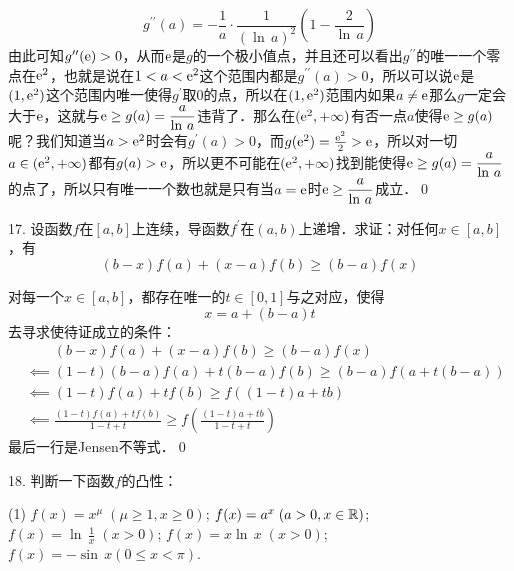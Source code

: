 \begin{equation}
    g^{\prime\prime}(a) = -\frac{1}{a} \cdot \frac{1}{\left( \ln \, a\right)^2} \left(1 - \frac{2}{\ln \, a}\right)
\end{equation}
由此可知$g^{\prime\prime}(\mathrm{e}) > 0$，从而$\mathrm{e}$是$g$的一个极小值点，并且还可以看出$g^{\prime\prime}$的唯一一个零点在$\mathrm{e}^2$，也就是说在$1 < a < \mathrm{e}^2$这个范围内都是$g^{\prime\prime}(a)> 0$，所以可以说$\mathrm{e}$是$(1,\mathrm{e}^2)$这个范围内唯一使得$g^{\prime}$取$0$的点，所以在$(1,\mathrm{e}^2)$范围内如果$a \neq \mathrm{e}$那么$g$一定会大于$\mathrm{e}$，这就与$\mathrm{e} \geq g(a) = \displaystyle\frac{a}{\ln \, a}$违背了．那么在$(\mathrm{e}^2, +\infty)$有否一点$a$使得$\mathrm{e} \geq g(a)$呢？我们知道当$a > \mathrm{e}^2$时会有$g^{\prime}(a) > 0$，而$g(\mathrm{e}^2) = \frac{\mathrm{e}^2}{2} > \mathrm{e}$，所以对一切$a \in (\mathrm{e}^2, +\infty)$都有$g(a) > \mathrm{e}$，所以更不可能在$(\mathrm{e}^2, +\infty)$找到能使得$\mathrm{e} \geq g(a) = \displaystyle\frac{a}{\ln \, a}$的点了，所以只有唯一一个数也就是只有当$a = \mathrm{e}$时$\mathrm{e} \geq \displaystyle\frac{a}{\ln \, a}$成立．\qed\bigskip

17. 设函数$f$在$[a,b]$上连续，导函数$f^\prime$在$(a,b)$上递增．求证：对任何$x \in [a,b]$，有
\begin{equation*}
    (b-x)f(a)+(x-a)f(b) \geq (b-a)f(x)
\end{equation*}

\prove 对每一个$x \in [a,b]$，都存在唯一的$t \in [0,1]$与之对应，使得
\begin{equation}
    x = a + (b-a)t
\end{equation}
去寻求使待证成立的条件：
\begin{align}
    &\mathrel{\phantom{\impliedby}} (b-x)f(a)+(x-a)f(b) \geq (b-a)f(x) \\
    &\impliedby (1-t)(b-a)f(a)+t(b-a)f(b) \geq (b-a)f(a+t(b-a)) \\
    &\impliedby (1-t)f(a) + t f(b) \geq f((1-t)a+t b) \\
    &\impliedby \frac{\left(1-t\right)f(a) + t f(b)}{1-t+t} \geq f \left(\frac{\left(1-t\right) a + t b}{1-t + t}\right)
\end{align}
最后一行是Jensen不等式．\qed\bigskip

18. 判断一下函数$f$的凸性：

\begin{tasks}(1)
    \task $f(x) = x^\mu \; (\mu \geq 1, x \geq 0)$;
    \task $f(x) = a^x \; (a > 0, x \in \mathbb{R})$;
    \task $f(x) = \displaystyle\ln \, \frac{1}{x} \; (x > 0)$;
    \task $f(x) = x \ln \, x \; \left(x > 0\right)$;
    \task $f(x) = - \sin \, x \left( 0 \leq x < \pi \right)$.
\end{tasks}

